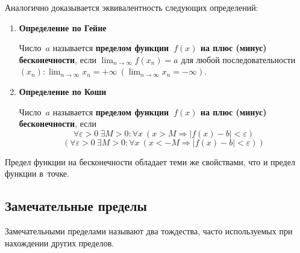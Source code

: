 Аналогично доказывается эквивалентность следующих определений:
\begin{enumerate}
	\item \textbf{Определение по Гейне}
	
	Число~$a$ называется \textbf{пределом функции~$f(x)$ на плюс (минус) бесконечности}, если $\displaystyle \lim_{n \to \infty} f(x_n) = a$ для любой последовательности~$\displaystyle (x_n): \lim_{n \to \infty} x_n = +\infty \ (\lim_{n \to \infty} x_n = -\infty)$.
	
	\item \textbf{Определение по Коши}
	
	Число~$a$ называется \textbf{пределом функции~$f(x)$ на плюс (минус) бесконечности}, если
	\begin{equation*}
	\forall \varepsilon > 0 \ \exists M > 0 \colon \forall x \ (x > M \Rightarrow |f(x) - b| < \varepsilon)
	\end{equation*}
	\begin{equation*}
	(\forall \varepsilon > 0 \ \exists M > 0 \colon \forall x \ (x < -M \Rightarrow |f(x) - b| < \varepsilon))
	\end{equation*}
\end{enumerate}

Предел функции на бесконечности обладает теми же свойствами, что и предел функции в~точке.

\subsection{Замечательные пределы}
Замечательными пределами называют два тождества, часто используемых при нахождении других пределов.

